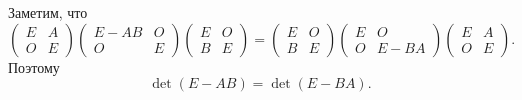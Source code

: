 \documentclass{article}
\begin{document}
Заметим, что
$$\left( \begin{array}{cc} E&A\\O&E \end{array} \right) \left( \begin{array}{cc} E-AB&O\\O&E \end{array} \right) \left( \begin{array}{cc} E&O\\B&E \end{array} \right) = \left( \begin{array}{cc} E&O\\B&E \end{array} \right) \left( \begin{array}{cc} E&O\\O&E - BA \end{array} \right) \left( \begin{array}{cc} E&A\\O&E \end{array} \right).$$
Поэтому
$$\det(E - AB) = \det(E - BA).$$
\end{document}
